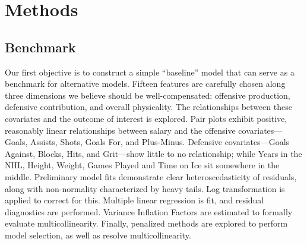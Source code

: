 \documentclass[10pt]{article}
\begin{document}
\section{Methods}
\subsection{Benchmark}
Our first objective is to construct a simple “baseline” model that can serve as a benchmark for alternative models. Fifteen features are carefully chosen along three dimensions we believe should be well-compensated: offensive production, defensive contribution, and overall physicality. The relationships between these covariates and the outcome of interest is explored. Pair plots exhibit positive, reasonably linear relationships between salary and the offensive covariates—Goals, Assists, Shots, Goals For, and Plus-Minus. Defensive covariates—Goals Against, Blocks, Hits, and Grit—show little to no relationship; while Years in the NHL, Height, Weight, Games Played and Time on Ice sit somewhere in the middle. Preliminary model fits demonstrate clear heteroscedasticity of residuals, along with non-normality characterized by heavy tails. Log transformation is applied to correct for this.
Multiple linear regression is fit, and residual diagnostics are performed. Variance Inflation Factors are estimated to formally evaluate multicollinearity. Finally, penalized methods are explored to perform model selection, as well as resolve multicollinearity. 
\end{document}
